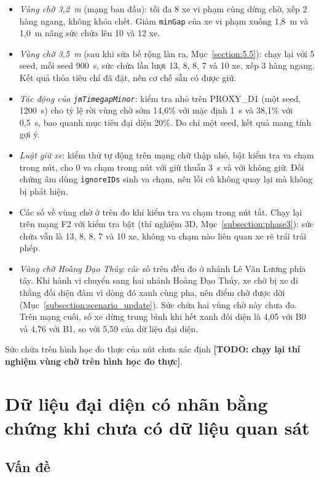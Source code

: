 \documentclass[../DoAn.tex]{subfiles}
\begin{document}
\begin{itemize}
    \item \emph{Vùng chờ 3,2~m} (mạng ban đầu): tối đa 8 xe vi phạm cùng dừng chờ, xếp 2 hàng ngang, không khóa chết. Giảm \texttt{minGap} của xe vi phạm xuống 1,8~m và 1,0~m nâng sức chứa lên 10 và 12 xe.
    \item \emph{Vùng chờ 3,5~m} (sau khi sửa bề rộng làn ra, Mục~\ref{section:5.5}): chạy lại với 5 seed, mỗi seed 900~s, sức chứa lần lượt 13, 8, 8, 7 và 10 xe, xếp 3 hàng ngang. Kết quả thỏa tiêu chí đã đặt, nên cơ chế sẵn có được giữ.
    \item \emph{Tác động của \texttt{jmTimegapMinor}}: kiểm tra nhỏ trên PROXY\_D1 (một seed, 1200~s) cho tỷ lệ rời vùng chờ sớm 14,6\% với mặc định 1~s và 38,1\% với 0,5~s, bao quanh mục tiêu đại diện 20\%. Do chỉ một seed, kết quả mang tính gợi ý.
    \item \emph{Luật giữ xe}: kiểm thử tự động trên mạng chữ thập nhỏ, bật kiểm tra va chạm trong nút, cho 0 va chạm trong nút với giữ thuần 3~s và với không giữ. Đối chứng âm dùng \texttt{ignoreIDs} sinh va chạm, nên lỗi cũ không quay lại mà không bị phát hiện.
    \item Các số về vùng chờ ở trên đo khi kiểm tra va chạm trong nút tắt. Chạy lại trên mạng F2 với kiểm tra bật (thí nghiệm 3D, Mục~\ref{subsection:phase3}): sức chứa vẫn là 13, 8, 8, 7 và 10 xe, không va chạm nào liên quan xe rẽ trái trái phép.
    \item \emph{Vùng chờ Hoàng Đạo Thúy}: các số trên đều đo ở nhánh Lê Văn Lương phía tây. Khi hành vi chuyển sang hai nhánh Hoàng Đạo Thúy, xe chờ bị xe đi thẳng đối diện đâm vì dòng đó xanh cùng pha, nên điểm chờ được dời (Mục~\ref{subsection:scenario_update}). Sức chứa hai vùng chờ này chưa đo. Trên mạng cuối, số xe dừng trung bình khi hết xanh đối diện là 4,05 với B0 và 4,76 với B1, so với 5,59 của dữ liệu đại diện.
\end{itemize}
Sức chứa trên hình học đo thực của nút chưa xác định \textbf{[TODO: chạy lại thí nghiệm vùng chờ trên hình học đo thực]}.

\section{Dữ liệu đại diện có nhãn bằng chứng khi chưa có dữ liệu quan sát}
\label{section:5.4}

\subsection{Vấn đề}
\end{document}
